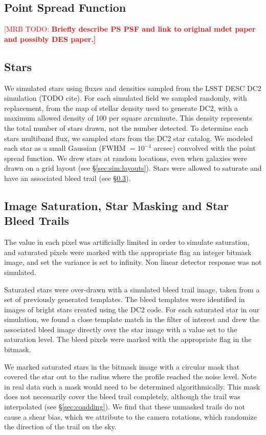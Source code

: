 \documentclass[iop, twocolappendix, appendixfloats, numberedappendix, apj]{hackemulateapj}
\newcommand{\mattodo}[1]{\textcolor{red}{[MRB TODO: \bf #1]}}
\begin{document}
\subsection{Point Spread Function} \label{sec:sim:psfs}

\mattodo{Briefly describe PS PSF and link to original mdet paper and possibly
DES paper.}

\subsection{Stars} \label{sec:sim:stars}

We simulated stars using fluxes and densities sampled from the LSST DESC DC2
simulation (TODO cite).  For each simulated field we sampled randomly, with
replacement, from the map of stellar density used to generate DC2, with a
maximum allowed density of 100 per square arcminute.  This density represents
the total number of stars drawn, not the number detected.  To determine each
stars multiband flux, we sampled stars from the DC2 star catalog.  We modeled
each star as a small Gaussian (FWHM $= 10^{-4}$ arcsec) convolved with the
point spread function.  We drew stars at random locations, even when galaxies
were drawn on a grid layout (see \S \ref{sec:sim:layouts}).  Stars were allowed
to saturate and have an associated bleed trail (see
\S \ref{sec:sim:satbleeds}).

\subsection{Image Saturation, Star Masking and Star Bleed Trails} \label{sec:sim:satbleeds}

The value in each pixel was artificially limited in order to simulate
saturation, and saturated pixels were marked with the appropriate flag an
integer bitmask image, and set the variance is set to infinity.  Non linear
detector response was not simulated.

Saturated stars were over-drawn with a simulated bleed trail image, taken from
a set of previously generated templates.  The bleed templates were identified
in images of bright stars created using the DC2 code.  For each saturated star
in our simulation, we found a close template match in the filter of interest
and drew the associated bleed image directly over the star image with a value
set to the saturation level. The bleed pixels were marked with the appropriate
flag in the bitmask.

We marked saturated stars in the bitmask image with a circular mask that
covered the star out to the radius where the profile reached the noise level.
Note in real data such a mask would need to be determined algorithmically.
This mask does not necessarily cover the bleed trail completely, although the
trail was interpolated (see \S \ref{sec:coadding}).  We find that these
unmasked trails do not cause a shear bias, which we attribute to the
camera rotations, which randomize the direction of the trail on the sky.
\end{document}

